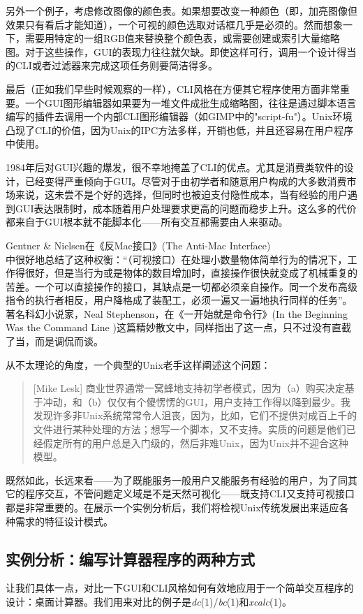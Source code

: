 \documentclass[12pt,oneside]{book}
\begin{document}
另外一个例子，考虑修改图像的颜色表。如果想要改变一种颜色（即，加亮图像但效果只有看后才能知道），一个可视的颜色选取对话框几乎是必须的。然而想象一下，需要用特定的一组RGB值来替换整个颜色表，或需要创建或索引大量缩略图。对于这些操作，GUI的表现力往往就欠缺。即使这样可行，调用一个设计得当的CLI或者过滤器来完成这项任务则要简洁得多。

最后（正如我们早些时候观察的一样），CLI风格在方便其它程序使用方面非常重要。一个GUI图形编辑器如果要为一堆文件成批生成缩略图，往往是通过脚本语言编写的插件去调用一个内部CLI图形编辑器（如GIMP中的"script-fu"）。Unix环境凸现了CLI的价值，因为Unix的IPC方法多样，开销也低，并且还容易在用户程序中使用。

1984年后对GUI兴趣的爆发，很不幸地掩盖了CLI的优点。尤其是消费类软件的设计，已经变得严重倾向于GUI。尽管对于由初学者和随意用户构成的大多数消费市场来说，这未尝不是个好的选择，但同时也被迫支付隐性成本，当有经验的用户遇到GUI表达限制时，成本随着用户处理要求更高的问题而稳步上升。这么多的代价都来自于GUI根本就不能脚本化——所有交互都需要由人来驱动。

Gentner \&{} Nielsen在《反Mac接口》(The Anti-Mac Interface)\\ \cite{Gentner-Nielsen}中很好地总结了这种权衡：“（可视接口）在处理小数量物体简单行为的情况下，工作得很好，但是当行为或是物体的数目增加时，直接操作很快就变成了机械重复的苦差。一个可以直接操作的接口，其缺点是一切都必须亲自操作。同一个发布高级指令的执行者相反，用户降格成了装配工，必须一遍又一遍地执行同样的任务”。著名科幻小说家，Neal Stephenson，在《一开始就是命令行》(In the Beginning Was the Command Line \cite{Stephenson})这篇精妙散文中，同样指出了这一点，只不过没有直截了当，而是调侃而谈。

从不太理论的角度，一个典型的Unix老手这样阐述这个问题：
\begin{quote}[Mike Lesk]
商业世界通常一窝蜂地支持初学者模式，因为（a）购买决定基于冲动，和（b）仅仅有个傻愣愣的GUI，用户支持工作得以降到最少。我发现许多非Unix系统常常令人沮丧，因为，比如，它们不提供对成百上千的文件进行某种处理的方法；想写一个脚本，又不支持。实质的问题是他们已经假定所有的用户总是入门级的，然后非难Unix，因为Unix并不迎合这种模型。
\end{quote}

既然如此，长远来看——为了既能服务一般用户又能服务有经验的用户，为了同其它的程序交互，不管问题定义域是不是天然可视化——既支持CLI又支持可视接口都是非常重要的。在展示一个实例分析后，我们将检视Unix传统发展出来适应各种需求的特征设计模式。

\subsection{实例分析：编写计算器程序的两种方式}
让我们具体一点，对比一下GUI和CLI风格如何有效地应用于一个简单交互程序的设计：桌面计算器。我们用来对比的例子是\textit{dc}(1)/\textit{bc}(1)和\textit{xcalc}(1)。
\end{document}
